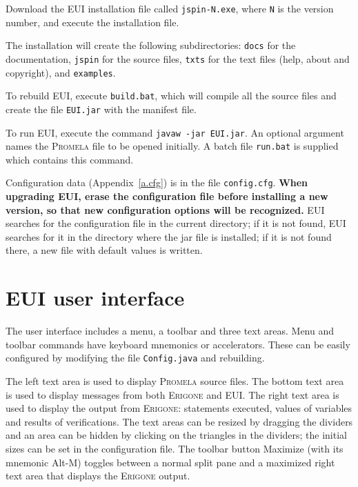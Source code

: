 \documentclass[11pt]{article}
\newcommand{\eri}{\textsc{Erigone}}
\newcommand{\prm}{\textsc{Promela}}
\newcommand{\eui}{\textsc{EUI}}
\newcommand{\p}[1]{\texttt{#1}}
\newcommand{\bu}[1]{\textsf{#1}}
\begin{document}
Download the \eui{} installation file called \p{jspin-N.exe},
where \p{N} is the version number, and execute the installation file.

The installation will create the following subdirectories: \p{docs} for the
documentation, \p{jspin} for the source files, 
\p{txts} for the text files
(help, about and copyright), and \p{examples}.

To rebuild \eui{}, execute \p{build.bat}, which will compile all the source
files and create the file \p{EUI.jar} with the manifest file.

To run \eui{}, execute the command \p{javaw -jar EUI.jar}.
An optional argument names the \prm{} file to be opened initially.
A batch file \p{run.bat} is supplied which contains this command.

Configuration data (Appendix~\ref{a.cfg}) is in the file
\p{config.cfg}.
\textbf{When upgrading \eui{}, erase the configuration file before installing
a new version, so that new configuration options will be recognized.}
\eui{} searches for the configuration file in the current
directory; if it is not found, \eui{} searches for it in the directory
where the jar file is installed; if it is not found there, a new file
with default values is written.

\section{\eui{} user interface}
The user interface includes a menu, a toolbar and three text areas.
Menu and toolbar commands have keyboard mnemonics or accelerators.
These can be easily configured by modifying the file \p{Config.java} and
rebuilding.

The left text area is used to display \prm{} source files. The bottom
text area is used to display messages from both \eri{} and \eui{}. The
right text area is used to display the output from \eri{}: statements
executed, values of variables and results of verifications. The text
areas can be resized by dragging the dividers and an area can be hidden
by clicking on the triangles in the dividers; the initial sizes can be
set in the configuration file. The toolbar button \bu{Maximize} (with
its mnemonic \bu{Alt-M}) toggles between a normal split pane and a
maximized right text area that displays the \eri{} output.
\end{document}
